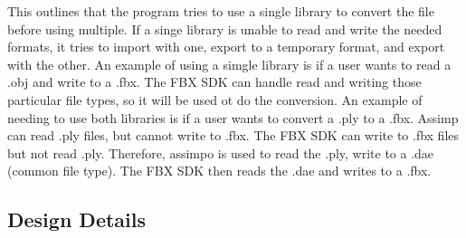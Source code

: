         This outlines that the program tries to use a single library to convert the file before using multiple.  If a singe library is unable to 
        read and write the needed formats, it tries to import with one, export to a temporary format, and export with the other.  An example of 
        using a simgle library is if a user wants to read a .obj and write to a .fbx.  The FBX SDK can handle read and writing those particular file
        types, so it will be used ot do the conversion.  An example of needing to use both libraries is if a user wants to convert a .ply to a .fbx.
        Assimp can read .ply files, but cannot write to .fbx.  The FBX SDK can write to .fbx files but not read .ply.  Therefore, assimpo is used to 
        read the .ply, write to a .dae (common file type).  The FBX SDK then reads the .dae and writes to a .fbx.

    \subsection{Design Details}

